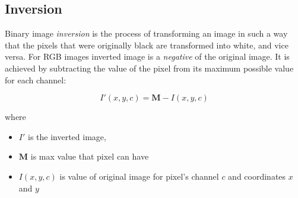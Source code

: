 \subsection{Inversion}

Binary image \emph{inversion} is the process of transforming an image in such a way that the pixels that were originally black are transformed into white, and vice versa. For RGB images inverted image is a \emph{negative} of the original image. \cite{inversion_matlab} It is achieved by subtracting the value of the pixel from its maximum possible value for each channel:

\begin{equation}
    I'(x, y, c) = \mathbf{M} - I(x, y, c)
\end{equation}

where
\begin{itemize}
    \item $I'$ is the inverted image,
    \item $\mathbf{M}$ is max value that pixel can have
    \item $I(x, y, c)$ is value of original image for pixel's channel $c$ and coordinates $x$ and $y$
\end{itemize}

